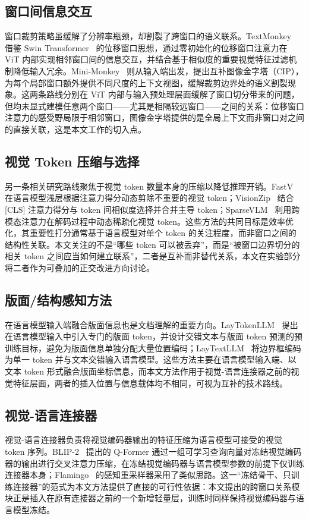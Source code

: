 \documentclass[journal]{IEEEtran}
\begin{document}
\subsection{窗口间信息交互}
窗口裁剪策略虽缓解了分辨率瓶颈，却割裂了跨窗口的语义联系。TextMonkey~\cite{textmonkey} 借鉴 Swin Transformer~\cite{swin} 的位移窗口思想，通过零初始化的位移窗口注意力在 ViT 内部实现相邻窗口间的信息交互，并结合基于相似度的重要视觉特征过滤机制降低输入冗余。Mini-Monkey~\cite{minimonkey} 则从输入端出发，提出互补图像金字塔（CIP），为每个局部窗口额外提供不同尺度的上下文视图，缓解裁剪边界处的语义割裂现象。这两条路线分别在 ViT 内部与输入预处理层面缓解了窗口切分带来的问题，但均未显式建模任意两个窗口——尤其是相隔较远窗口——之间的关系：位移窗口注意力的感受野局限于相邻窗口，图像金字塔提供的是全局上下文而非窗口对之间的直接关联，这是本文工作的切入点。

\subsection{视觉 Token 压缩与选择}
另一条相关研究路线聚焦于视觉 token 数量本身的压缩以降低推理开销。FastV~\cite{fastv} 在语言模型浅层根据注意力得分动态剪除不重要的视觉 token；VisionZip~\cite{visionzip} 结合 [CLS] 注意力得分与 token 间相似度选择并合并主导 token；SparseVLM~\cite{sparsevlm} 利用跨模态注意力在解码过程中动态稀疏化视觉 token。这些方法的共同目标是效率优化，其重要性打分通常基于语言模型对单个 token 的关注程度，而非窗口之间的结构性关联。本文关注的不是“哪些 token 可以被丢弃”，而是“被窗口边界切分的相关 token 之间应当如何建立联系”，二者是互补而非替代关系，本文在实验部分将二者作为可叠加的正交改进方向讨论。

\subsection{版面/结构感知方法}
在语言模型输入端融合版面信息也是文档理解的重要方向。LayTokenLLM~\cite{laytoken} 提出在语言模型输入中引入专门的版面 token，并设计交错文本与版面 token 预测的预训练目标，避免为版面信息单独分配大量位置编码；LayTextLLM~\cite{laytext} 将边界框编码为单一 token 并与文本交错输入语言模型。这些方法主要在语言模型输入端、以文本 token 形式融合版面坐标信息，而本文方法作用于视觉-语言连接器之前的视觉特征层面，两者的插入位置与信息载体均不相同，可视为互补的技术路线。

\subsection{视觉-语言连接器}
视觉-语言连接器负责将视觉编码器输出的特征压缩为语言模型可接受的视觉 token 序列。BLIP-2~\cite{blip2} 提出的 Q-Former 通过一组可学习查询向量对冻结视觉编码器的输出进行交叉注意力压缩，在冻结视觉编码器与语言模型参数的前提下仅训练连接器本身；Flamingo~\cite{flamingo} 的感知重采样器采用了类似思路。这一“冻结骨干、只训练连接器”的范式为本文方法提供了直接的可行性依据：本文提出的跨窗口关系模块正是插入在原有连接器之前的一个新增轻量层，训练时同样保持视觉编码器与语言模型冻结。
\end{document}
